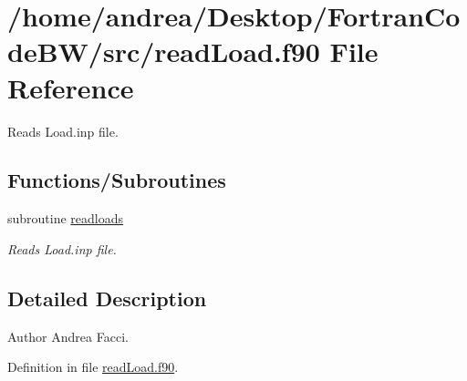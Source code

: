 \hypertarget{read_load_8f90}{\section{/home/andrea/\-Desktop/\-Fortran\-Code\-B\-W/src/read\-Load.f90 File Reference}
\label{read_load_8f90}
}


Reads Load.\-inp file.  


\subsection*{Functions/\-Subroutines}
\begin{DoxyCompactItemize}
\item 
subroutine \hyperlink{read_load_8f90_a7cfc2afc3abd098872413af5bb794e4c}{readloads}
\begin{DoxyCompactList}\small\item\em Reads Load.\-inp file. \end{DoxyCompactList}\end{DoxyCompactItemize}


\subsection{Detailed Description}
\begin{DoxyAuthor}{Author}
Andrea Facci. 
\end{DoxyAuthor}


Definition in file \hyperlink{read_load_8f90_source}{read\-Load.\-f90}.



